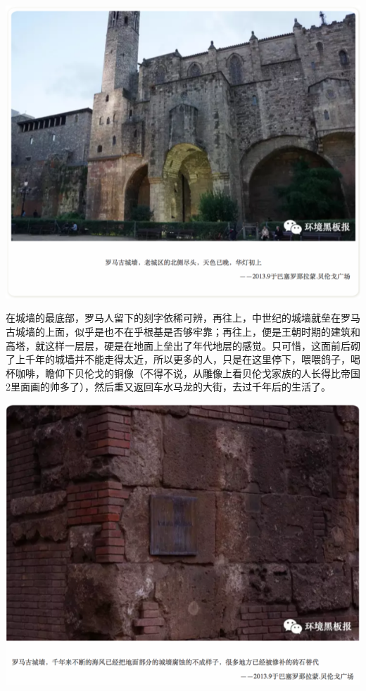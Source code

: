 \documentclass[]{book}
\begin{document}
\includegraphics[width=8.33in]{images/xt20}

在城墙的最底部，罗马人留下的刻字依稀可辨，再往上，中世纪的城墙就垒在罗马古城墙的上面，似乎是也不在乎根基是否够牢靠；再往上，便是王朝时期的建筑和高塔，就这样一层层，硬是在地面上垒出了年代地层的感觉。只可惜，这面前后砌了上千年的城墙并不能走得太近，所以更多的人，只是在这里停下，喂喂鸽子，喝杯咖啡，瞻仰下贝伦戈的铜像（不得不说，从雕像上看贝伦戈家族的人长得比帝国2里面画的帅多了），然后重又返回车水马龙的大街，去过千年后的生活了。

\includegraphics[width=8.33in]{images/xt21}
\end{document}
